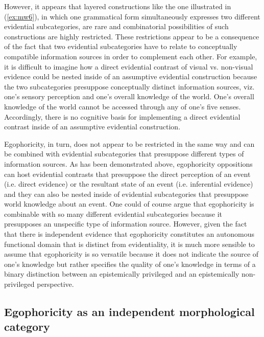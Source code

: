 \documentclass[output=paper]{langsci/langscibook}
\begin{document}
However, it appears that layered constructions like the one illustrated in (\ref{ex:mw6}), in which one grammatical form simultaneously expresses two different evidential subcategories, are rare and combinatorial possibilities of such constructions are highly restricted. These restrictions appear to be a consequence of the fact that two evidential subcategories have to relate to conceptually compatible information sources in order to complement each other. For example, it is difficult to imagine how a direct evidential contrast of visual vs. non-visual evidence could be nested inside of an assumptive evidential construction because the two subcategories presuppose conceptually distinct information sources, viz. one’s sensory perception and one’s overall knowledge of the world. One’s overall knowledge of the world cannot be accessed through any of one’s five senses. Accordingly, there is no cognitive basis for implementing a direct evidential contrast inside of an assumptive evidential construction.

Egophoricity, in turn, does not appear to be restricted in the same way and can be combined with evidential subcategories that presuppose different types of information sources. As has been demonstrated above, egophoricity oppositions can host evidential contrasts that presuppose the direct perception of an event (i.e. direct evidence) or the resultant state of an event (i.e. inferential evidence) and they can also be nested inside of evidential subcategories that presuppose world knowledge about an event. One could of course argue that egophoricity is combinable with so many different evidential subcategories because it presupposes an unspecific type of information source. However, given the fact that there is independent evidence that egophoricity constitutes an autonomous functional domain that is distinct from evidentiality, it is much more sensible to assume that egophoricity is so versatile because it does not indicate the source of one’s knowledge but rather specifies the quality of one’s knowledge in terms of a binary distinction between an epistemically privileged and an epistemically non-privileged perspective.

\subsection{Egophoricity as an independent morphological category}\label{s:mw4-2}
\end{document}
